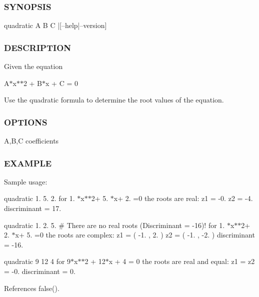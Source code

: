 \subsubsection*{S\+Y\+N\+O\+P\+S\+IS}

\begin{DoxyVerb}    quadratic A B C |[--help|--version]
\end{DoxyVerb}


\subsubsection*{D\+E\+S\+C\+R\+I\+P\+T\+I\+ON}

Given the equation

A$\ast$x$\ast$$\ast$2 + B$\ast$x + C = 0

Use the quadratic formula to determine the root values of the equation.

\subsubsection*{O\+P\+T\+I\+O\+NS}

A,B,C coefficients

\subsubsection*{E\+X\+A\+M\+P\+LE}

Sample usage\+:

quadratic 1. 5. 2. for 1. $\ast$x$\ast$$\ast$2+ 5. $\ast$x+ 2. =0 the roots are real\+: z1 = -\/0. z2 = -\/4. discriminant = 17.

quadratic 1. 2. 5. \# There are no real roots (Discriminant = -\/16)! for 1. $\ast$x$\ast$$\ast$2+ 2. $\ast$x+ 5. =0 the roots are complex\+: z1 = ( -\/1. , 2. ) z2 = ( -\/1. , -\/2. ) discriminant = -\/16.

quadratic 9 12 4 for 9$\ast$x$\ast$$\ast$2 + 12$\ast$x + 4 = 0 the roots are real and equal\+: z1 = z2 = -\/0. discriminant = 0. 

References false().

